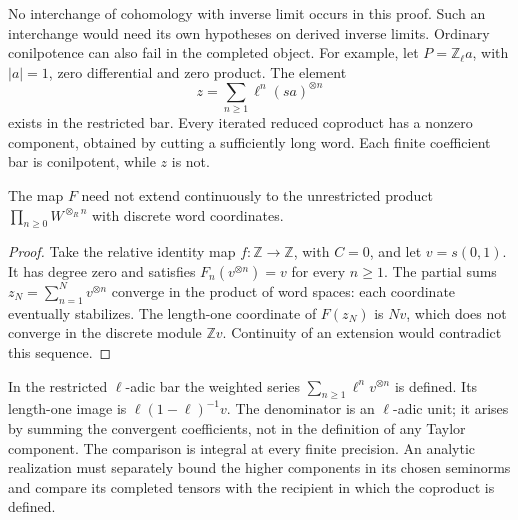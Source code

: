 No interchange of cohomology with inverse limit occurs in this proof.
Such an interchange would need its own hypotheses on derived inverse
limits. Ordinary conilpotence can also fail in the completed object.
For example, let \(P=\mathbb Z_\ell a\), with \(|a|=1\), zero
differential and zero product. The element
\[
 z=\sum_{n\geq1}\ell^n(sa)^{\otimes n}
\]
exists in the restricted bar. Every iterated reduced coproduct has
a nonzero component, obtained by cutting a sufficiently long word.
Each finite coefficient bar is conilpotent, while \(z\) is not.

\begin{proposition}\label{v4-arith:gluing:prop:noncontinuity}
The map \(F\) need not extend continuously to the unrestricted
product \(\prod_{n\geq0}W^{\otimes_R n}\) with discrete word
coordinates.
\end{proposition}

\begin{proof}
Take the relative identity map \(f:\mathbb Z\to\mathbb Z\), with
\(C=0\), and let \(v=s(0,1)\). It has degree zero and satisfies
\(F_n(v^{\otimes n})=v\) for every \(n\geq1\).
The partial sums \(z_N=\sum_{n=1}^Nv^{\otimes n}\) converge in the
product of word spaces: each coordinate eventually stabilizes.
The length-one coordinate of \(F(z_N)\) is \(Nv\), which does not
converge in the discrete module \(\mathbb Z v\). Continuity of an
extension would contradict this sequence.
\end{proof}

In the restricted \(\ell\)-adic bar the weighted series
\(\sum_{n\geq1}\ell^nv^{\otimes n}\) is defined. Its length-one image
is \(\ell(1-\ell)^{-1}v\). The denominator is an \(\ell\)-adic unit;
it arises by summing the convergent coefficients, not in the definition
of any Taylor component. The comparison is integral at every finite
precision. An analytic realization must separately bound the higher
components in its chosen seminorms and compare its completed tensors
with the recipient in which the coproduct is defined.
